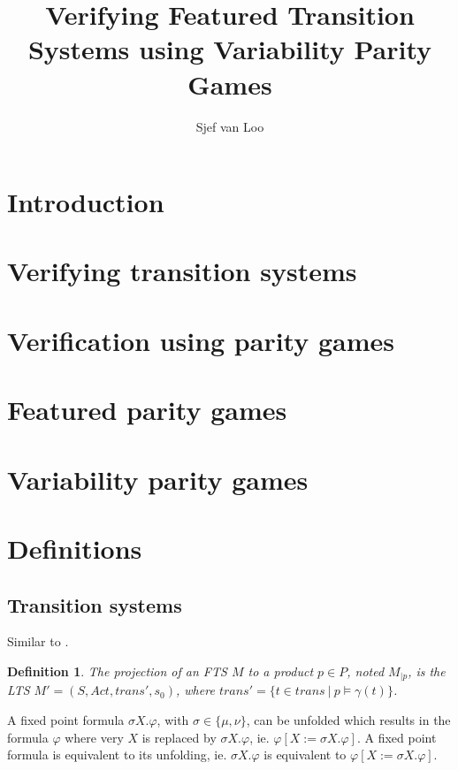 \documentclass[]{article}
\title{Verifying Featured Transition Systems using Variability Parity Games}
\author{Sjef van Loo}
\newtheorem{definition}{Definition}[section]
\begin{document}
\maketitle

\section{Introduction}


\section{Verifying transition systems}


\section{Verification using parity games}


\section{Featured parity games}


\section{Variability parity games}


\section{Definitions}
\subsection{Transition systems}
Similar to \cite{Classen2013FeaturedTS}.




\begin{definition}
	\label{def_fts_proj}
	The projection of an FTS $M$ to a product $p \in P$, noted $M_{|p}$, is the LTS $M'=(S,Act,trans', s_0)$, where $trans' = \{t \in trans\ |\ p \models \gamma(t)\}$.
\end{definition}

A fixed point formula $ \sigma X. \varphi$, with $\sigma \in \{\mu,\nu\}$, can be unfolded which results in the formula $\varphi$ where very $X$ is replaced by $\sigma X. \varphi$, ie. $\varphi[X:=\sigma X. \varphi]$. A fixed point formula is equivalent to its unfolding, ie. $\sigma X. \varphi$ is equivalent to $\varphi[X:=\sigma X. \varphi]$. \cite{Bradfield2018}
\end{document}

